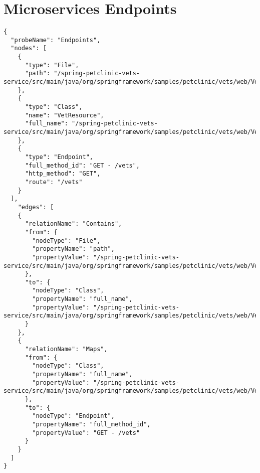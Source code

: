 \section{Microservices Endpoints}\label{appendix_sec:microservices_endpoints}
\begin{lstlisting}
{
  "probeName": "Endpoints",
  "nodes": [
    {
      "type": "File",
      "path": "/spring-petclinic-vets-service/src/main/java/org/springframework/samples/petclinic/vets/web/VetResource.java"
    },
    {
      "type": "Class",
      "name": "VetResource",
      "full_name": "/spring-petclinic-vets-service/src/main/java/org/springframework/samples/petclinic/vets/web/VetResource.java:VetResource"
    },
    {
      "type": "Endpoint",
      "full_method_id": "GET - /vets",
      "http_method": "GET",
      "route": "/vets"
    }
  ],
    "edges": [
    {
      "relationName": "Contains",
      "from": {
        "nodeType": "File",
        "propertyName": "path",
        "propertyValue": "/spring-petclinic-vets-service/src/main/java/org/springframework/samples/petclinic/vets/web/VetResource.java"
      },
      "to": {
        "nodeType": "Class",
        "propertyName": "full_name",
        "propertyValue": "/spring-petclinic-vets-service/src/main/java/org/springframework/samples/petclinic/vets/web/VetResource.java:VetResource"
      }
    },
    {
      "relationName": "Maps",
      "from": {
        "nodeType": "Class",
        "propertyName": "full_name",
        "propertyValue": "/spring-petclinic-vets-service/src/main/java/org/springframework/samples/petclinic/vets/web/VetResource.java:VetResource"
      },
      "to": {
        "nodeType": "Endpoint",
        "propertyName": "full_method_id",
        "propertyValue": "GET - /vets"
      }
    }
  ]
}
\end{lstlisting}

